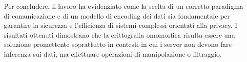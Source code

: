 \documentclass[12pt,a4paper,twoside]{book}
\begin{document}
Per concludere, il lavoro ha evidenziato come la scelta di un corretto paradigma di comunicazione e di un modello di encoding dei dati sia fondamentale per garantire la sicurezza e l'efficienza di sistemi complessi orientati alla privacy. I risultati ottenuti dimostrano che la crittografia omomorfica risulta essere una soluzione promettente soprattutto in contesti in cui i server non devono fare inferenza sui dati, ma effettuare operazioni di manipolazione o filtraggio.
\end{document}
